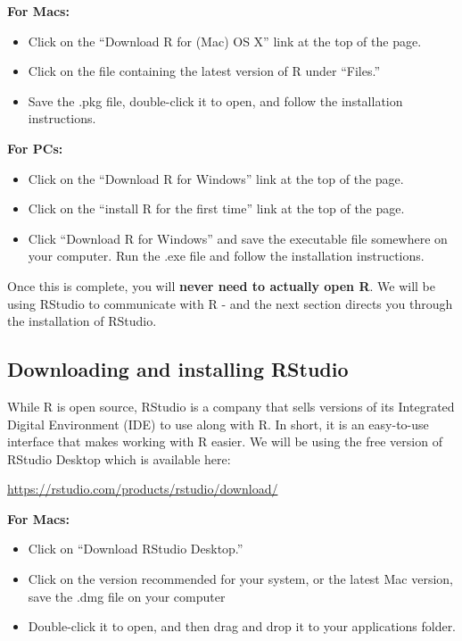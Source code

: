 \documentclass[
]{book}
\begin{document}
\textbf{For Macs:}

\begin{itemize}
\item
  Click on the ``Download R for (Mac) OS X'' link at the top of the page.
\item
  Click on the file containing the latest version of R under ``Files.''
\item
  Save the .pkg file, double-click it to open, and follow the installation instructions.
\end{itemize}

\textbf{For PCs:}

\begin{itemize}
\item
  Click on the ``Download R for Windows'' link at the top of the page.
\item
  Click on the ``install R for the first time'' link at the top of the page.
\item
  Click ``Download R for Windows'' and save the executable file somewhere on your computer. Run the .exe file and follow the installation instructions.
\end{itemize}

Once this is complete, you will \textbf{never need to actually open R}. We will be using RStudio to communicate with R - and the next section directs you through the installation of RStudio.

\hypertarget{downloading-and-installing-rstudio}{%
\subsection{Downloading and installing RStudio}\label{downloading-and-installing-rstudio}}

While R is open source, RStudio is a company that sells versions of its Integrated Digital Environment (IDE) to use along with R. In short, it is an easy-to-use interface that makes working with R easier. We will be using the free version of RStudio Desktop which is available here:

\url{https://rstudio.com/products/rstudio/download/}

\textbf{For Macs:}

\begin{itemize}
\item
  Click on ``Download RStudio Desktop.''
\item
  Click on the version recommended for your system, or the latest Mac version, save the .dmg file on your computer
\item
  Double-click it to open, and then drag and drop it to your applications folder.
\end{itemize}
\end{document}
